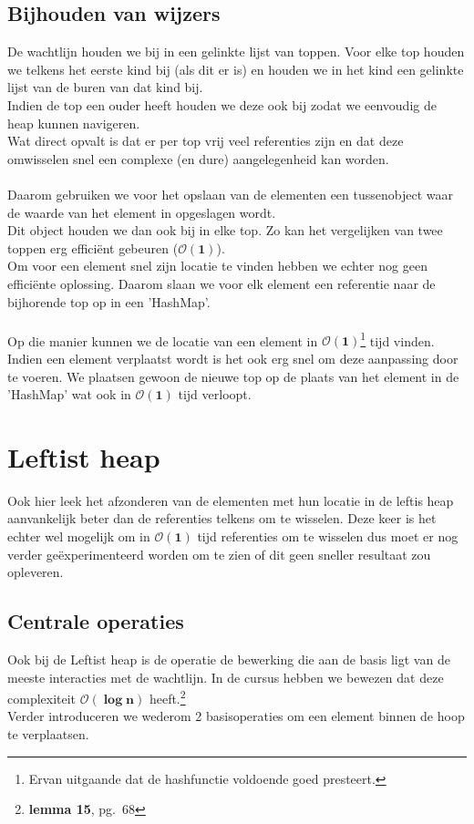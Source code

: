 \documentclass[a4paper,12pt]{report}
\newcommand{\bigO}[1]{$\bm{\mathcal{O}(#1)}$} %
\begin{document}
\subsection{Bijhouden van wijzers}
De wachtlijn houden we bij in een gelinkte lijst van toppen. Voor elke top houden we telkens het eerste kind bij (als dit er is) en houden we in het kind een gelinkte lijst van de buren van dat kind bij. \\
Indien de top een ouder heeft houden we deze ook bij zodat we eenvoudig de heap kunnen navigeren. \\
Wat direct opvalt is dat er per top vrij veel referenties zijn en dat deze omwisselen snel een complexe (en dure) aangelegenheid kan worden. \\ \\
Daarom gebruiken we voor het opslaan van de elementen een tussenobject waar de waarde van het element in opgeslagen wordt. \\ 
Dit object houden we dan ook bij in elke top. Zo kan het vergelijken van twee toppen erg effici\"ent gebeuren (\bigO{1}). \\
Om voor een element snel zijn locatie te vinden hebben we echter nog geen effici\"ente oplossing. Daarom slaan we voor elk element een referentie naar de bijhorende top op in een 'HashMap'. \\ \\
Op die manier kunnen we de locatie van een element in \bigO{1}\footnote{Ervan uitgaande dat de hashfunctie voldoende goed presteert.} tijd vinden. \\
Indien een element verplaatst wordt is het ook erg snel om deze aanpassing door te voeren. We plaatsen gewoon de nieuwe top op de plaats van het element in de 'HashMap' wat ook in \bigO{1} tijd verloopt.



\newpage
\section{Leftist heap}
Ook hier leek het afzonderen van de elementen met hun locatie in de leftis heap aanvankelijk beter dan de referenties telkens om te wisselen. Deze keer is het echter wel mogelijk om in \bigO{1} tijd referenties om te wisselen dus moet er nog verder ge\"experimenteerd worden om te zien of dit geen sneller resultaat zou opleveren.
\subsection{Centrale operaties}
Ook bij de Leftist heap is de  operatie de bewerking die aan de basis ligt van de meeste interacties met de wachtlijn. In de cursus hebben we bewezen dat deze complexiteit \bigO{\log n} heeft.\footnote{\textbf{lemma 15}, pg.~68} \\
Verder introduceren we wederom 2 basisoperaties om een element binnen de hoop te verplaatsen.
\end{document}
